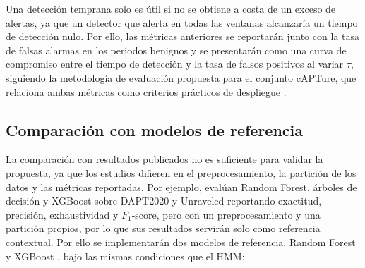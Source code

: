Una detección temprana solo es útil si no se obtiene a costa de un exceso de alertas, ya que un detector que alerta en todas las ventanas alcanzaría un tiempo de detección nulo. Por ello, las métricas anteriores se reportarán junto con la tasa de falsas alarmas en los periodos benignos y se presentarán como una curva de compromiso entre el tiempo de detección y la tasa de falsos positivos al variar $\tau$, siguiendo la metodología de evaluación propuesta para el conjunto cAPTure, que relaciona ambas métricas como criterios prácticos de despliegue \parencite{puccetti_capture_2026}.

\subsection{Comparación con modelos de referencia}
\label{sec:baseline}
La comparación con resultados publicados no es suficiente para validar la propuesta, ya que los estudios difieren en el preprocesamiento, la partición de los datos y las métricas reportadas. Por ejemplo, \textcite{rivas_analysis_2025} evalúan Random Forest, árboles de decisión y XGBoost sobre DAPT2020 y Unraveled reportando exactitud, precisión, exhaustividad y $F_1$-score, pero con un preprocesamiento y una partición propios, por lo que sus resultados servirán solo como referencia contextual. Por ello se implementarán dos modelos de referencia, Random Forest \parencite{breiman2001random} y XGBoost \parencite{chen2016xgboost}, bajo las mismas condiciones que el HMM:

